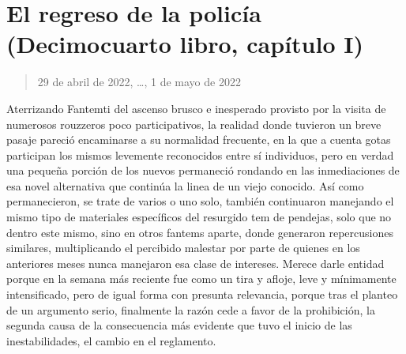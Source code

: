 \documentclass[
]{book}
\begin{document}
\hypertarget{el-regreso-de-la-policuxeda-decimocuarto-libro-capuxedtulo-i}{%
\section{El regreso de la policía (Decimocuarto libro, capítulo I)}\label{el-regreso-de-la-policuxeda-decimocuarto-libro-capuxedtulo-i}}

\begin{quote}
29 de abril de 2022, \ldots, 1 de mayo de 2022
\end{quote}

Aterrizando Fantemti del ascenso brusco e inesperado provisto por la visita de numerosos rouzzeros poco participativos, la realidad donde tuvieron un breve pasaje pareció encaminarse a su normalidad frecuente, en la que a cuenta gotas participan los mismos levemente reconocidos entre sí individuos, pero en verdad una pequeña porción de los nuevos permaneció rondando en las inmediaciones de esa novel alternativa que continúa la linea de un viejo conocido. Así como permanecieron, se trate de varios o uno solo, también continuaron manejando el mismo tipo de materiales específicos del resurgido tem de pendejas, solo que no dentro este mismo, sino en otros fantems aparte, donde generaron repercusiones similares, multiplicando el percibido malestar por parte de quienes en los anteriores meses nunca manejaron esa clase de intereses. Merece darle entidad porque en la semana más reciente fue como un tira y afloje, leve y mínimamente intensificado, pero de igual forma con presunta relevancia, porque tras el planteo de un argumento serio, finalmente la razón cede a favor de la prohibición, la segunda causa de la consecuencia más evidente que tuvo el inicio de las inestabilidades, el cambio en el reglamento.
\end{document}
